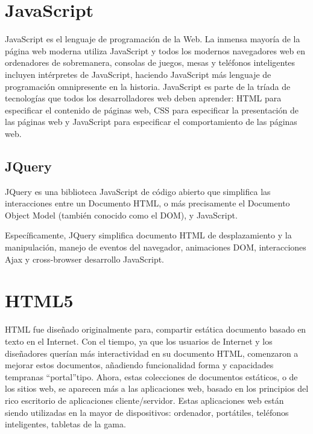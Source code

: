 \section{JavaScript} 

JavaScript es el lenguaje de programaci\'{o}n de la Web. La inmensa mayor\'{i}a
de la p\'{a}gina web moderna utiliza JavaScript y todos los modernos navegadores
web en ordenadores de sobremanera, consolas de juegos, mesas y tel\'{e}fonos 
inteligentes incluyen int\'{e}rpretes de JavaScript, haciendo JavaScript m\'{a}s
lenguaje de programaci\'{o}n  omnipresente en la historia. JavaScript es parte de
la tr\'{i}ada de tecnolog\'{i}as que todos los desarrolladores web deben aprender:
HTML para especificar el contenido de p\'{a}ginas web, CSS para especificar la 
presentaci\'{o}n de las p\'{a}ginas web y JavaScript para especificar el comportamiento
de las p\'{a}ginas web. \cite{flanagan2006javascript}

\subsection{JQuery}

JQuery es una biblioteca JavaScript de c\'{o}digo abierto que simplifica las 
interacciones entre un Documento HTML, o m\'{a}s precisamente el Documento 
Object Model (tambi\'{e}n conocido como el DOM), y JavaScript.

Espec\'{i}ficamente, JQuery simplifica documento HTML de desplazamiento y la 
manipulaci\'{o}n, manejo de eventos del navegador, animaciones DOM, interacciones
Ajax y cross-browser desarrollo JavaScript.\cite{lindley2009jquery}

\section{HTML5}

HTML fue dise\~{n}ado originalmente para, compartir est\'{a}tica documento basado
en texto en el Internet. Con el tiempo, ya que los usuarios de Internet y los 
dise\~{n}adores quer\'{i}an m\'{a}s interactividad en su documento HTML, comenzaron
a mejorar estos documentos, a\~{n}adiendo funcionalidad forma y capacidades tempranas
\textquotedblleft portal\textquotedblright tipo. Ahora, estas colecciones de 
documentos est\'{a}ticos, o de los sitios web, se aparecen m\'{a}s a las aplicaciones
web, basado en los principios del rico escritorio de aplicaciones cliente/servidor.
Estas aplicaciones web est\'{a}n siendo utilizadas en la mayor de dispositivos: 
ordenador, port\'{a}tiles, tel\'{e}fonos inteligentes, tabletas de la gama.

